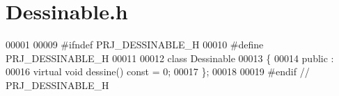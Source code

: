 \section{Dessinable.\+h}
\label{_dessinable_8h_source}

\begin{DoxyCode}
00001 
00009 \textcolor{preprocessor}{#ifndef PRJ\_DESSINABLE\_H}
00010 \textcolor{preprocessor}{#define PRJ\_DESSINABLE\_H}
00011 
00012 \textcolor{keyword}{class }Dessinable
00013 \{
00014     \textcolor{keyword}{public} :
00016     \textcolor{keyword}{virtual} \textcolor{keywordtype}{void} dessine() \textcolor{keyword}{const} = 0;
00017 \};
00018 
00019 \textcolor{preprocessor}{#endif // PRJ\_DESSINABLE\_H}
\end{DoxyCode}
